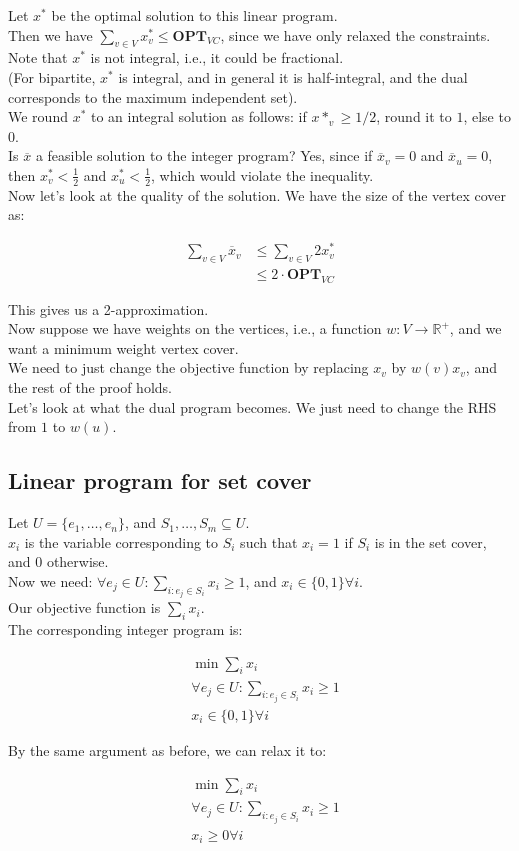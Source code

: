\documentclass[a4paper]{article}
\newcommand{\nl}{\vspace{0.2cm}\\}
\newcommand{\ol}{\overline}
\newcommand{\R}{\mathbb{R}}
\newcommand{\OPT}{\mathbf{OPT}}
\begin{document}
Let $x^*$ be the optimal solution to this linear program.\nl
Then we have $\sum_{v \in V} {x^*_v} \le \OPT_{VC}$, since we have only relaxed the constraints.
Note that $x^*$ is not integral, i.e., it could be fractional.\nl
(For bipartite, $x^*$ is integral, and in general it is half-integral, and the dual corresponds to the maximum independent set).\nl
We round $x^*$ to an integral solution as follows: if $x*_v \ge 1/2$, round it to $1$, else to $0$.\nl

Is $\ol{x}$ a feasible solution to the integer program? Yes, since if $\ol{x}_v = 0$ and $\ol{x}_u = 0$, then $x^*_v < \frac{1}{2}$ and $x^*_u < \frac{1}{2}$, which would violate the
inequality.\nl

Now let's look at the quality of the solution. We have the size of the vertex cover as:

\begin{align*}
    \sum_{v \in V} \ol{x}_v &\le \sum_{v \in V} 2 x^*_v\\
                            &\le 2\cdot \OPT_{VC}
\end{align*}

This gives us a 2-approximation.\nl

Now suppose we have weights on the vertices, i.e., a function $w : V \to \R^+$, and we want a minimum weight vertex cover.\nl
We need to just change the objective function by replacing $x_v$ by $w(v) x_v$, and the rest of the proof holds.\nl

Let's look at what the dual program becomes.
We just need to change the RHS from $1$ to $w(u)$.

\subsection{Linear program for set cover}

Let $U = \{e_1, \ldots, e_n\}$, and $S_1, \ldots, S_m \subseteq U$.\nl
$x_i$ is the variable corresponding to $S_i$ such that $x_i = 1$ if $S_i$ is in the set cover, and 0 otherwise.\nl
Now we need: $\forall e_j \in U: \sum_{i: e_j \in S_i} x_i \ge 1$, and $x_i \in \{0, 1\} \forall i$.\nl
Our objective function is $\sum_{i} x_i$.\nl

The corresponding integer program is:

\begin{align*}
    &\min \sum_{i} x_i\\
    &\forall e_j \in U: \sum_{i : e_j \in S_i} x_i \ge 1\\
    &x_i \in \{0, 1\} \forall i
\end{align*}

By the same argument as before, we can relax it to:

\begin{align*}
    &\min \sum_{i} x_i\\
    &\forall e_j \in U: \sum_{i : e_j \in S_i} x_i \ge 1\\
    &x_i \ge 0 \forall i
\end{align*}
\end{document}
